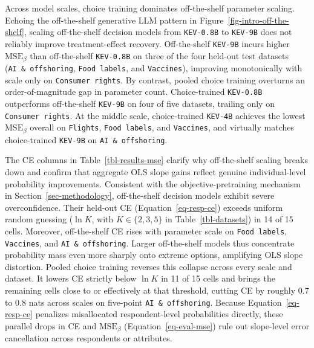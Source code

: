 \documentclass[
  11pt,
  letterpaper,
]{article}
\makeatletter
\newcommand\table@defaultsize{\footnotesize}
\let\table@size\table@defaultsize
\newcommand\nexttablesize[1]{\gdef\table@size{#1}}
\makeatother
\begin{document}
Across model scales, choice training dominates off-the-shelf parameter
scaling. Echoing the off-the-shelf generative LLM pattern in
Figure~\ref{fig-intro-off-the-shelf}, scaling off-the-shelf decision
models from \texttt{KEV-0.8B} to \texttt{KEV-9B} does not reliably
improve treatment-effect recovery. Off-the-shelf \texttt{KEV-9B} incurs
higher \(\mathrm{MSE}_\beta\) than off-the-shelf \texttt{KEV-0.8B} on
three of the four held-out test datasets (\texttt{AI\ \&\ offshoring},
\texttt{Food\ labels}, and \texttt{Vaccines}), improving monotonically
with scale only on \texttt{Consumer\ rights}. By contrast, pooled choice
training overturns an order-of-magnitude gap in parameter count.
Choice-trained \texttt{KEV-0.8B} outperforms off-the-shelf
\texttt{KEV-9B} on four of five datasets, trailing only on
\texttt{Consumer\ rights}. At the middle scale, choice-trained
\texttt{KEV-4B} achieves the lowest \(\mathrm{MSE}_\beta\) overall on
\texttt{Flights}, \texttt{Food\ labels}, and \texttt{Vaccines}, and
virtually matches choice-trained \texttt{KEV-9B} on
\texttt{AI\ \&\ offshoring}.

The CE columns in Table~\ref{tbl-results-mse} clarify why off-the-shelf
scaling breaks down and confirm that aggregate OLS slope gains reflect
genuine individual-level probability improvements. Consistent with the
objective-pretraining mechanism in Section~\ref{sec-methodology},
off-the-shelf decision models exhibit severe overconfidence. Their
held-out CE (Equation~\ref{eq-resp-ce}) exceeds uniform random guessing
(\(\ln K\), with \(K \in \{2, 3, 5\}\) in Table~\ref{tbl-datasets}) in
14 of 15 cells. Moreover, off-the-shelf CE rises with parameter scale on
\texttt{Food\ labels}, \texttt{Vaccines}, and
\texttt{AI\ \&\ offshoring}. Larger off-the-shelf models thus
concentrate probability mass even more sharply onto extreme options,
amplifying OLS slope distortion. Pooled choice training reverses this
collapse across every scale and dataset. It lowers CE strictly below
\(\ln K\) in 11 of 15 cells and brings the remaining cells close to or
effectively at that threshold, cutting CE by roughly 0.7 to 0.8 nats
across scales on five-point \texttt{AI\ \&\ offshoring}. Because
Equation~\ref{eq-resp-ce} penalizes misallocated respondent-level
probabilities directly, these parallel drops in CE and
\(\mathrm{MSE}_\beta\) (Equation~\ref{eq-eval-mse}) rule out slope-level
error cancellation across respondents or attributes.

\nexttablesize{\scriptsize}
\end{document}
